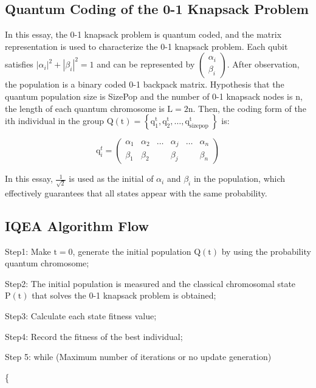 \documentclass[10pt]{article}
\begin{document}
\subsection{Quantum Coding of the 0-1 Knapsack Problem}
In this essay, the 0-1 knapsack problem is quantum coded, and the matrix representation is used to characterize the 0-1 knapsack problem. Each qubit satisfies $\left|\alpha_{i}\right|^{2}+\left|\beta_{i}\right|^{2}=1$ and can be represented by $\left(\begin{array}{c}\alpha_{i} \\ \beta_{i}\end{array}\right)$. After observation, the population is a binary coded 0-1 backpack matrix. Hypothesis that the quantum population size is SizePop and the number of 0-1 knapsack nodes is $\mathrm{n}$, the length of each quantum chromosome is $\mathrm{L}=2 \mathrm{n}$. Then, the coding form of the ith individual in the group $\mathrm{Q}(\mathrm{t})=\left\{\mathrm{q}_{1}^{\mathrm{t}}, \mathrm{q}_{2}^{\mathrm{t}}, \ldots, \mathrm{q}_{\text {sizepop }}^{\mathrm{t}}\right\}$ is:

$$
\mathrm{q}_{i}^{t}=\left(\begin{array}{cccccc}
\alpha_{1} & \alpha_{2} & \ldots & \alpha_{j} & \ldots & \alpha_{n} \\
\beta_{1} & \beta_{2} & & \beta_{j} & & \beta_{n}
\end{array}\right)
$$

In this essay, $\frac{1}{\sqrt{2}}$ is used as the initial of $\alpha_{i}$ and $\beta_{i}$ in the population, which effectively guarantees that all states appear with the same probability.

\subsection{IQEA Algorithm Flow}
Step1: Make $\mathrm{t}=0$, generate the initial population $\mathrm{Q}(\mathrm{t})$ by using the probability quantum chromosome;

Step2: The initial population is measured and the classical chromosomal state $\mathrm{P}(\mathrm{t})$ that solves the 0-1 knapsack problem is obtained;

Step3: Calculate each state fitness value;

Step4: Record the fitness of the best individual;

Step 5: while (Maximum number of iterations or no update generation)

\{
\end{document}
